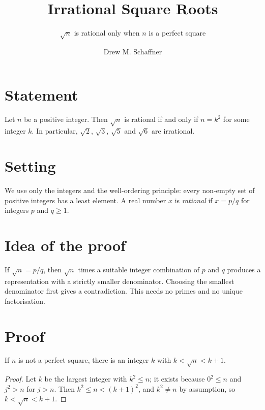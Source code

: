 \documentclass[11pt,a4paper]{article}
\title{Irrational Square Roots}
\subtitle{$\sqrt{n}$ is rational only when $n$ is a perfect square}
\author{Drew M. Schaffner}
\begin{document}
\maketitle

\section{Statement}

\begin{theorem}\label{thm:main}
  Let $n$ be a positive integer. Then $\sqrt{n}$ is rational if and only if $n = k^2$
  for some integer $k$. In particular, $\sqrt2$, $\sqrt3$, $\sqrt5$ and $\sqrt6$ are
  irrational.
\end{theorem}

\section{Setting}

We use only the integers and the well-ordering principle: every non-empty set of
positive integers has a least element. A real number $x$ is \emph{rational} if
$x = p/q$ for integers $p$ and $q \geq 1$.

\section{Idea of the proof}

If $\sqrt n = p/q$, then $\sqrt n$ times a suitable integer combination of $p$ and
$q$ produces a representation with a strictly smaller denominator. Choosing the
smallest denominator first gives a contradiction. This needs no primes and no
unique factorisation.

\section{Proof}

\begin{lemma}\label{lem:floor}
  If $n$ is not a perfect square, there is an integer $k$ with $k < \sqrt n < k + 1$.
\end{lemma}

\begin{proof}
  Let $k$ be the largest integer with $k^2 \leq n$; it exists because $0^2 \leq n$
  and $j^2 > n$ for $j > n$. Then $k^2 \leq n < (k+1)^2$, and $k^2 \neq n$ by
  assumption, so $k < \sqrt n < k + 1$.
\end{proof}
\end{document}
